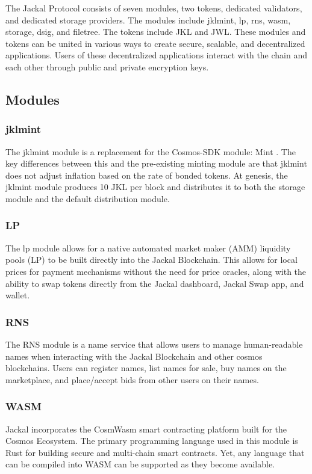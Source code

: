 \documentclass[a4paper]{article}
\begin{document}
The Jackal Protocol consists of seven modules, two tokens, dedicated validators, and dedicated storage providers. The modules include jklmint, lp, rns, wasm, storage, dsig, and filetree. The tokens include JKL and JWL.  These modules and tokens can be united in various ways to create secure, scalable, and decentralized applications. Users of these decentralized applications interact with the chain and each other through public and private encryption keys.

\newpage
\subsection{Modules}
\subsubsection{jklmint}
The jklmint module is a replacement for the Cosmos-SDK module: Mint \cite{mint}. The key differences between this and the pre-existing minting module are that jklmint does not adjust inflation based on the rate of bonded tokens. At genesis, the jklmint module produces 10 JKL per block and distributes it to both the storage module and the default distribution module.

\subsubsection{LP}
The lp module allows for a native automated market maker (AMM) liquidity pools (LP) to be built directly into the Jackal Blockchain. This allows for local prices for payment mechanisms without the need for price oracles, along with the ability to swap tokens directly from the Jackal dashboard, Jackal Swap app, and wallet. 


\subsubsection{RNS}
The RNS module is a name service that allows users to manage human-readable names when interacting with the Jackal Blockchain and other cosmos blockchains. Users can register names, list names for sale, buy names on the marketplace, and place/accept bids from other users on their names.

\subsubsection{WASM}
Jackal incorporates the CosmWasm \cite{cosmwasm} smart contracting platform built for the Cosmos Ecosystem. The primary programming language used in this module is Rust for building secure and multi-chain smart contracts. Yet, any language that can be compiled into WASM can be supported as they become available. 
\end{document}
